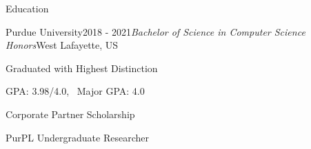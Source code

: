 \documentclass{resume} %
\begin{document}
 

\vspace{-6.0em}
\begin{rSection}{Education}

\begin{rSubsection}{Purdue University}{2018 - 2021}{\textit{Bachelor of Science in Computer Science Honors}}{West Lafayette, US}
\item Graduated with Highest Distinction
\item GPA: 3.98/4.0, \ Major GPA: 4.0
\item Corporate Partner Scholarship
\item PurPL Undergraduate Researcher
\end{rSubsection}

\end{rSection}

\end{document}
